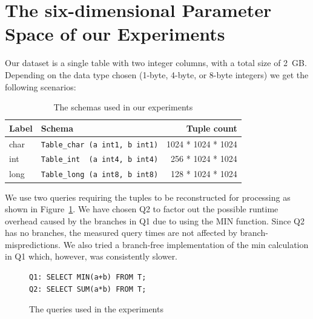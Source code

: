 \documentclass{sig-alternate}
\begin{document}
\section{The six-dimensional Parameter Space of our Experiments}

 Our dataset is a single table with two integer columns, with a total size of 2~GB. Depending on the data type chosen (1-byte, 4-byte, or 8-byte integers) we get the following scenarios:

\begin{table}[!ht]
  \vspace{-5pt}
  \scriptsize
  \centering
  \begin{tabular}{| l | l | r |}
    \hline
    {\bf Label} & {\bf Schema} & {\bf Tuple count} \\ \hline \hline
    char & \texttt{Table\_char (a int1, b int1)} & 1024 * 1024 * 1024 \\ \hline
    int & \texttt{Table\_int \  (a int4, b int4)} & 256 * 1024 * 1024 \\ \hline
    long & \texttt{Table\_long (a int8, b int8)} & 128 * 1024 * 1024 \\ \hline
    \end{tabular}
    \vspace{-5pt}
    \caption{The schemas used in our experiments}
    \label{tab:scenario}
    \vspace{-5pt}
\end{table}


 We use two queries requiring the tuples to be reconstructed for processing as shown in Figure~\ref{fig:queries}. We have chosen Q2 to factor out the possible runtime overhead caused by the branches in Q1 due to using the MIN function. Since Q2 has no branches, the measured query times are not affected by branch-mispredictions. We also tried a branch-free implementation of the min calculation in Q1 which, however, was consistently slower.

\begin{figure}[!ht]
\vspace{5pt}
\begin{lstlisting}[style=SQL]
Q1: SELECT MIN(a+b) FROM T;
Q2: SELECT SUM(a*b) FROM T;
\end{lstlisting}
   \vspace{-10pt}
    \caption{The queries used in the experiments}
    \label{fig:queries}
    \vspace{-10pt}
\end{figure}
\end{document}
